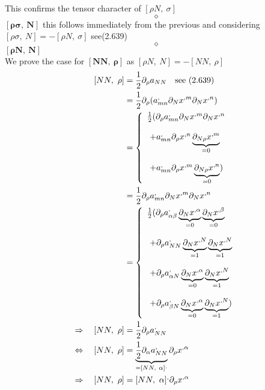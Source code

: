 This confirms the tensor character of $[ \rho N, \  \sigma] $
$$\diamond$$
$\boldsymbol{[ \rho \sigma, \  N]}$ this follows immediately from the previous and considering $[ \rho \sigma, \  N] = - [ \rho N, \  \sigma]$ see(2.639) \\
$$\diamond$$
$\boldsymbol{[\rho N, \ N ] }$\\
We prove the case for $\boldsymbol{[ NN, \ \rho ]}$  as $[\rho N, \ N ] = -[ NN, \ \rho ] $
\begin{align}
\ [ NN, \ \rho ] &= \half \partial_{\rho} a_{NN}\quad \text{see (2.639)}\\
\ &= \half \partial_{\rho} (a^{,}_{mn}\partial_{N}x^{,m}\partial_{N}x^{,n})\\
\ & = \left\{ \begin{array}{l}
\half (\partial_{\rho} a^{,}_{mn}\partial_{N}x^{,m}\partial_{N}x^{,n}\\\\
\ + a^{,}_{mn} \partial_{\rho}x^{,n} \underbrace{\partial_{N \rho}x^{,m}}_{=0}\\\\
\ + a^{,}_{mn} \partial_{\rho}x^{,m} \underbrace{\partial_{N \rho}x^{,n}}_{=0})
\end{array} \right.\\
\ &= \half \partial_{\rho} a^{,}_{mn}\partial_{N}x^{,m}\partial_{N}x^{,n}\\
\ &= \left\{ \begin{array}{l}
\half (\partial_{\rho} a^{,}_{\alpha\beta}\underbrace{\partial_{N}x^{,\alpha}}_{=0}\underbrace{\partial_{N}x^{,\beta}}_{=0}\\\\
\ +\partial_{\rho} a^{,}_{NN}\underbrace{\partial_{N}x^{,N}}_{=1}\underbrace{\partial_{N}x^{,N}}_{=1}\\\\
\ +\partial_{\rho} a^{,}_{\alpha N}\underbrace{\partial_{N}x^{,\alpha}}_{=0}\underbrace{\partial_{N}x^{,N}}_{=1}\\\\
\ +\partial_{\rho} a^{,}_{\beta N}\underbrace{\partial_{N}x^{,\alpha}}_{=0}\underbrace{\partial_{N}x^{,N}}_{=1})\\
\end{array} \right.\\
\Rightarrow \quad [ NN, \ \rho ] &= \half \partial_{\rho} a^{,}_{NN}\\
\Leftrightarrow \quad [ NN, \ \rho ] &=  \underbrace{\half \partial_{\alpha} a^{,}_{NN}}_{=[NN, \ \alpha]^,}\partial_{\rho}x^{,\alpha}\\
\Rightarrow \quad [ NN, \ \rho ] &=  [NN, \ \alpha]^, \partial_{\rho}x^{,\alpha}
\end{align}
